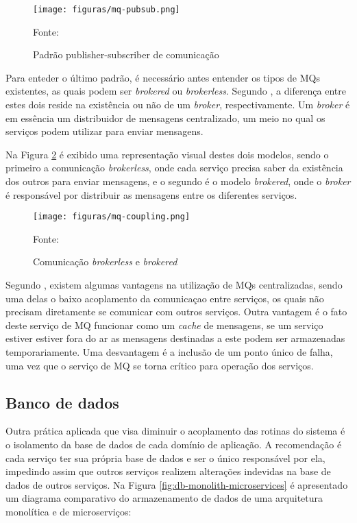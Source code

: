 \begin{figure}[H]
	\centering
	\caption{Padrão publisher-subscriber de comunicação}
	\texttt{[image: figuras/mq-pubsub.png]}

	\label{fig:mq-pubsub}
	\footnotesize Fonte: 
\end{figure}

Para enteder o último padrão, é necessário antes entender os tipos de \acp{MQ}
existentes, as quais podem ser \emph{brokered} ou \emph{brokerless}. Segundo
, a diferença entre estes dois reside na existência
ou não de um \emph{broker}, respectivamente. Um \emph{broker} é em essência um
distribuidor de mensagens centralizado, um meio no qual os serviços podem
utilizar para enviar mensagens.

Na Figura \ref{fig:mq-coupling} é exibido uma representação visual destes dois
modelos, sendo o primeiro a comunicação \emph{brokerless}, onde cada serviço
precisa saber da existência dos outros para enviar mensagens, e o segundo é
o modelo \emph{brokered}, onde o \emph{broker} é responsável por distribuir
as mensagens entre os diferentes serviços.

\begin{figure}[H]
	\centering
	\caption{Comunicação \emph{brokerless} e \emph{brokered}}
	\texttt{[image: figuras/mq-coupling.png]}

	\label{fig:mq-coupling}
	\footnotesize Fonte: 
\end{figure}

Segundo , existem algumas vantagens na utilização
de \acp{MQ} centralizadas, sendo uma delas o baixo acoplamento da comunicaçao
entre serviços, os quais não precisam diretamente se comunicar com outros
serviços. Outra vantagem é o fato deste serviço de \ac{MQ} funcionar como
um \emph{cache} de mensagens, se um serviço estiver estiver fora do ar as
mensagens destinadas a este podem ser armazenadas temporariamente. Uma
desvantagem é a inclusão de um ponto único de falha, uma vez que o serviço
de \ac{MQ} se torna crítico para operação dos serviços.

\subsection{Banco de dados}

Outra prática aplicada que visa diminuir o acoplamento das rotinas do sistema
é o isolamento da base de dados de cada domínio de aplicação. A recomendação é
cada serviço ter sua própria base de dados e ser o único responsável por ela,
impedindo assim que outros serviços realizem alterações indevidas na base de
dados de outros serviços. Na Figura \ref{fig:db-monolith-microservices}
é apresentado um diagrama comparativo do armazenamento de dados de uma
arquitetura monolítica e de microserviços:

